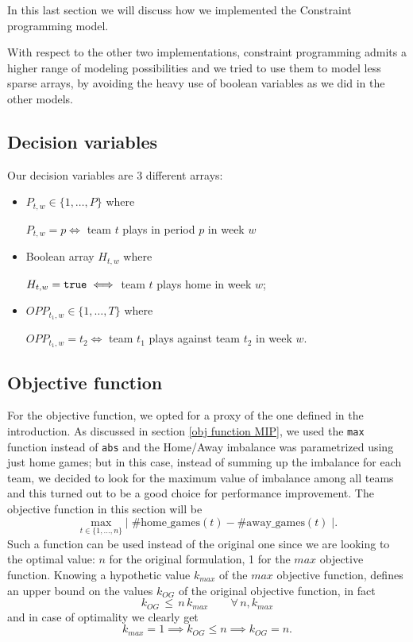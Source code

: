 In this last section we will discuss how we implemented the Constraint programming model.

With respect to the other two implementations, constraint programming admits a higher range of modeling possibilities and we tried to use them to model less sparse arrays, by avoiding the heavy use of boolean variables as we did in the other models.

\subsection{Decision variables}
Our decision variables are 3 different arrays:
\begin{itemize}
    \item $P_{t,w} \in \{1, \dots,P\}$ where 
    \begin{center}
    $ P_{t,w} = p \iff$ team $t$ plays in period $p$ in week $w$
    \end{center}
    \item Boolean array $H_{t,w}$ where 
    \begin{center}
    $ H_{t,w} = \verb|true| \iff$ team $t$ plays home in week $w$;
    \end{center}
    \item $OPP_{t_1,w}\in \{1,\dots,T\}$ where
    \begin{center}
    $OPP_{t_1,w} = t_2 \iff$ team $t_1$ plays against team $t_2$ in week $w$.
    \end{center}
\end{itemize}

\subsection{Objective function}\label{CP obj function}
For the objective function, we opted for a proxy of the one defined in the introduction.
As discussed in section \ref{obj function MIP}, we used the \verb|max| function instead of \verb|abs| and the Home/Away imbalance was parametrized using just home games; but in this case, instead of summing up the imbalance for each team, we decided to look for the maximum value of imbalance among all teams and this turned out to be a good choice for performance improvement.
The objective function in this section will be
\[
\max_{t \in \{1,\dots, n\}} \big| \; 
\#\text{home\_games}(t) - \#\text{away\_games}(t) \; \big|.
\]
Such a function can be used instead of the original one since we are looking to the optimal value: $n$ for the original formulation, 1 for the $max$ objective function.
Knowing a hypothetic value $k_{max}$ of the $max$ objective function, defines an upper bound on the values $k_{OG}$ of the original objective function, in fact
\[
k_{OG}\,\leq\, n\,k_{max} \qquad\forall\, n, k_{max}
\]
and in case of optimality we clearly get
\[
k_{max}=1 \implies k_{OG} \leq n \implies k_{OG}=n.
\]


